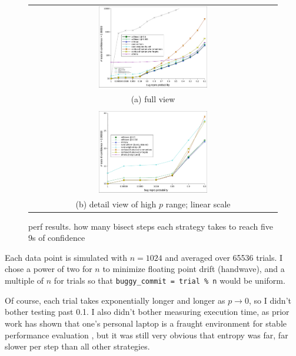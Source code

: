 \documentclass[11pt]{sigplanconf}
\begin{document}
\begin{figure}[ht]
	\begin{tabular}{c}
		\includegraphics[width=0.45\textwidth]{resulce.pdf}
		\\
		(a) full view
		\\
		\\
		\includegraphics[width=0.45\textwidth]{resulce-detail.pdf}
		\\
		(b) detail view of high $p$ range; linear scale
	\end{tabular}
	\caption{perf results.
	how many bisect steps each strategy takes to reach five 9s of confidence} %
	\label{fig:resulce}
\end{figure}

Each data point is simulated with $n=1024$ and averaged over 65536 trials.
I chose a power of two for $n$ to minimize floating point drift (handwave),
and a multiple of $n$ for trials so that {\tt buggy\_commit = trial \% n} would be uniform.

Of course, each trial takes exponentially
longer and longer as $p \rightarrow 0$, so I didn't bother testing past 0.1.
I also didn't bother measuring execution time,
as prior work has shown that one's personal laptop is a fraught environment for stable performance evaluation \cite{htm},
but it was still very obvious that {\sf entropy} was far, far slower per step than all other strategies.
\end{document}
